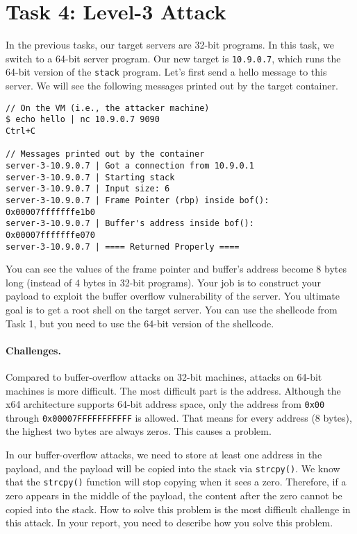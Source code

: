 \section{Task 4: Level-3 Attack} 

In the previous tasks, our target servers are 32-bit 
programs. In this task, we switch to a 64-bit server 
program.  Our new target is \texttt{10.9.0.7}, which 
runs the 64-bit version of the \texttt{stack} program.  
Let's first send a hello message to this server. 
We will see the following messages printed out by the target container. 

\begin{lstlisting}
// On the VM (i.e., the attacker machine)
$ echo hello | nc 10.9.0.7 9090
Ctrl+C

// Messages printed out by the container
server-3-10.9.0.7 | Got a connection from 10.9.0.1
server-3-10.9.0.7 | Starting stack
server-3-10.9.0.7 | Input size: 6
server-3-10.9.0.7 | Frame Pointer (rbp) inside bof():  0x00007fffffffe1b0
server-3-10.9.0.7 | Buffer's address inside bof():     0x00007fffffffe070
server-3-10.9.0.7 | ==== Returned Properly ====
\end{lstlisting}

You can see the values of the frame pointer and buffer's address
become 8 bytes long (instead of 4 bytes in 32-bit programs).
Your job is to construct your payload to exploit the buffer overflow
vulnerability of the server. 
You ultimate goal is to get a root shell on 
the target server. You can use the shellcode from Task 1, but 
you need to use the 64-bit version of the shellcode. 


\paragraph{Challenges.} Compared to buffer-overflow attacks on 32-bit 
machines, attacks on 64-bit machines is more difficult. The most 
difficult part is the address. Although the x64 architecture 
supports 64-bit address space, only the address from 
\texttt{0x00} through \texttt{0x00007FFFFFFFFFFF} is allowed. That means for 
every address (8 bytes), the highest two bytes are always zeros. 
This causes a problem.

In our buffer-overflow attacks, we need to store at least one address 
in the payload, and the payload will be copied into the stack via
\texttt{strcpy()}. We know that the \texttt{strcpy()} function
will stop copying when it sees a zero. Therefore, if a zero 
appears in the middle of the payload, the content after the 
zero cannot be copied into the stack. How to solve this 
problem is the most difficult challenge in this attack. In your 
report, you need to describe how you solve this problem. 




